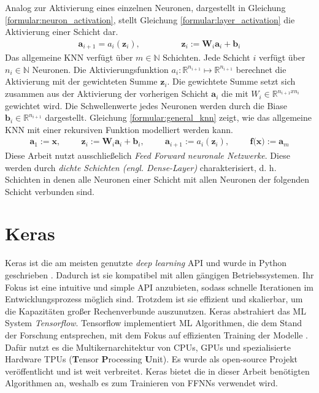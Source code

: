 Analog zur Aktivierung eines einzelnen Neuronen, dargestellt in Gleichung \ref{formular:neuron_activation}, stellt Gleichung \ref{formular:layer_activation} die Aktivierung einer Schicht dar.
\begin{align}
    \label{formular:layer_activation}
    \textbf{a}_{i+1} = a_i(\textbf{z}_i), \hspace{2cm} \textbf{z}_i := \textbf{W}_i\textbf{a}_i + \textbf{b}_i
\end{align}
Das allgemeine KNN verfügt über $m\in\mathbb{N}$ Schichten. Jede Schicht $i$ verfügt über $n_i\in\mathbb{N}$ Neuronen.
Die Aktivierungsfunktion $a_i:\mathbb{R}^{n_{i+1}}\mapsto\mathbb{R}^{n_{i+1}}$ berechnet die Aktivierung mit der gewichteten Summe $\textbf{z}_i$.
Die gewichtete Summe setzt sich zusammen aus der Aktivierung der vorherigen Schicht $\textbf{a}_i$ die mit $W_i\in\mathbb{R}^{n_{i+1}x{n_{i}}}$ gewichtet wird.
Die Schwellenwerte jedes Neuronen werden durch die Biase $\textbf{b}_i\in\mathbb{R}^{n_{i+1}}$ dargestellt.
Gleichung \ref{formular:general_knn} zeigt, wie das allgemeine KNN mit einer rekursiven Funktion modelliert werden kann.
\begin{align}
    \label{formular:general_knn}
    \textbf{a}_1 := \textbf{x}, \hspace{1cm}
    \textbf{z}_i := \textbf{W}_i\textbf{a}_i + \textbf{b}_i, \hspace{1cm}
    \textbf{a}_{i+1} := a_i(\textbf{z}_i), \hspace{1cm} \textbf{f(x)} := \textbf{a}_m
\end{align}
Diese Arbeit nutzt ausschließelich \textit{Feed Forward neuronale Netzwerke}.
Diese werden durch \textit{dichte Schichten (engl. Dense-Layer)} charakterisiert, d. h. Schichten in denen alle Neuronen einer Schicht mit allen Neuronen der folgenden Schicht verbunden sind.

\section{Keras}
Keras ist die am meisten genutzte \textit{deep learning} API und wurde in Python geschrieben \cite{kerasDoc}.
Dadurch ist sie kompatibel mit allen gängigen Betriebssystemen.
Ihr Fokus ist eine intuitive und simple API anzubieten, sodass schnelle Iterationen im Entwicklungsprozess möglich sind.
Trotzdem ist sie effizient und skalierbar, um die Kapazitäten großer Rechenverbunde auszunutzen.
\newline
\newline
Keras abstrahiert das ML System \textit{Tensorflow}. Tensorflow implementiert ML Algorithmen, die dem Stand der Forschung entsprechen, mit dem Fokus
auf effizienten Training der Modelle \cite{abadi2016tensorflow}.
Dafür nutzt es die Multikernarchitektur von CPUs, GPUs und spezialisierte Hardware TPUs (\textbf{T}ensor \textbf{P}rocessing \textbf{U}nit).
Es wurde als open-source Projekt veröffentlicht und ist weit verbreitet.
\newline
\newline
Keras bietet die in dieser Arbeit benötigten Algorithmen an, weshalb es zum Trainieren von FFNNs verwendet wird.

